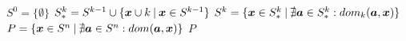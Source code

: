 \begin{algorithmic}[1] %
    \State $S^0 = \big\{\emptyset\big\}$
      \State $S_*^k = S^{k-1} \cup \{\boldsymbol{x} \cup k \:|\: \boldsymbol{x} \in S^{k-1}\}$
      \State $S^k = \{\boldsymbol{x} \in S_*^k \:|\: \nexists \boldsymbol{a} \in S_*^k: dom_k(\boldsymbol{a}, \boldsymbol{x}) \}$
    \EndFor
  \State $P = \{\boldsymbol{x} \in S^n \:|\: \nexists \boldsymbol{a} \in S^n: dom(\boldsymbol{a}, \boldsymbol{x}) \}$
  \State \Return $P$
  \EndFunction
\end{algorithmic}
